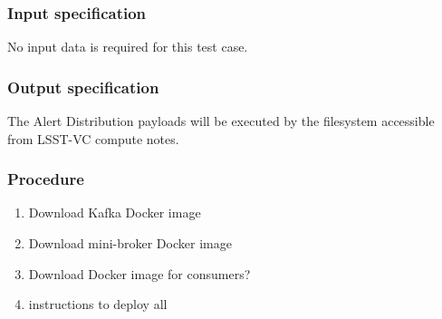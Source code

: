 \subsubsection{Input specification}

No input data is required for this test case.

\subsubsection{Output specification}

The Alert Distribution payloads will be executed by the 
filesystem accessible from LSST-VC compute notes.

\subsubsection{Procedure}

\begin{enumerate}

  \item{Download Kafka Docker image}
  \item{Download mini-broker Docker image}
  \item{Download Docker image for consumers?}
\item{instructions to deploy all}

\end{enumerate}
